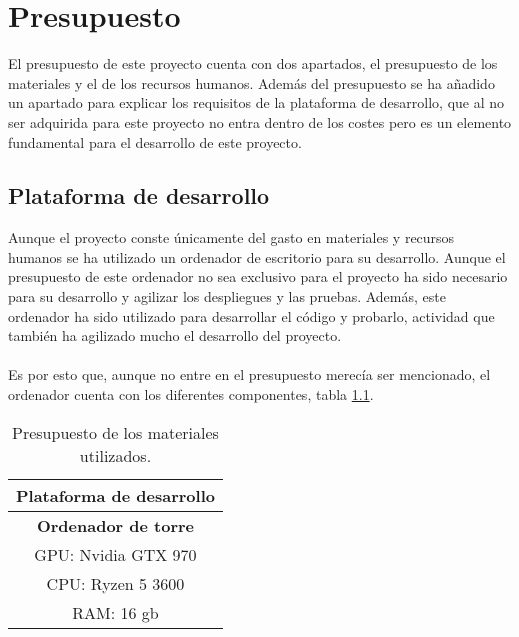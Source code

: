 \chapter{Presupuesto}
\thispagestyle{fancy}
El presupuesto de este proyecto cuenta con dos apartados, el presupuesto de los materiales y el de los recursos humanos. Además del presupuesto se ha añadido un apartado para explicar los requisitos de la plataforma de desarrollo, que al no ser adquirida para este proyecto no entra dentro de los costes pero es un elemento fundamental para el desarrollo de este proyecto. 


\section{Plataforma de desarrollo}
Aunque el proyecto conste únicamente del gasto en materiales y recursos humanos se ha utilizado un ordenador de escritorio para su desarrollo. Aunque el presupuesto de este ordenador no sea exclusivo para el proyecto ha sido necesario para su desarrollo y agilizar los despliegues y las pruebas. Además, este ordenador ha sido utilizado para desarrollar el código y probarlo, actividad que también ha agilizado mucho el desarrollo del proyecto.
\\ \\
Es por esto que, aunque no entre en el presupuesto merecía ser mencionado, el ordenador cuenta con los diferentes componentes, tabla \ref{tab:PlataformaDesarrollo}.

\begin{table}[H]
    \begin{center}
        \begin{tabular}{|c|}
            \hline
            \rowcolor{Cyan} 
            \textbf{Plataforma de desarrollo} \\ 
            \hline
            \rowcolor{GrisTabla}
            \textbf{Ordenador de torre} \\
            \hline
            GPU: Nvidia GTX 970 \\
            \hline
            CPU: Ryzen 5 3600 \\
            \hline
            RAM: 16 gb \\
            \hline
        \end{tabular}
        \caption{\centering Presupuesto de los materiales utilizados.}
        \label{tab:PlataformaDesarrollo}
    \end{center}    
\end{table}



